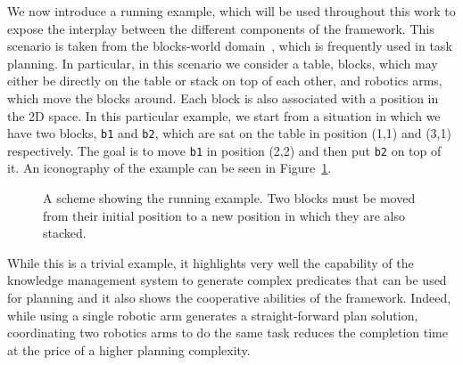 We now introduce a running example, which will be used throughout this work to expose the interplay between the different components of the framework. 
This scenario is taken from the blocks-world domain~\cite{blocksworld}, which is frequently used in task planning. In particular, in this scenario we consider a table, blocks, which may either be directly on the table or stack on top of each other, and robotics arms, which move the blocks around. Each block is also associated with a position in the 2D space. 
In this particular example, we start from a situation in which we have two blocks, \verb|b1| and \verb|b2|, which are sat on the table in position (1,1) and (3,1) respectively. The goal is to move \verb|b1| in position (2,2) and then put \verb|b2| on top of it. An iconography of the example can be seen in Figure~\ref{fig:running-example}.

\begin{figure}
    \centering
    
    \caption{A scheme showing the running example. Two blocks must be moved from their initial position to a new position in which they are also stacked.}
    \label{fig:running-example}
\end{figure}

While this is a trivial example, it highlights very well the
capability of the knowledge management system to generate complex
predicates that can be used for planning and it also shows the
cooperative abilities of the framework. Indeed, while using a single
robotic arm generates a straight-forward plan solution, coordinating
two robotics arms to do the same task reduces the completion time at the price
of a higher planning complexity.
